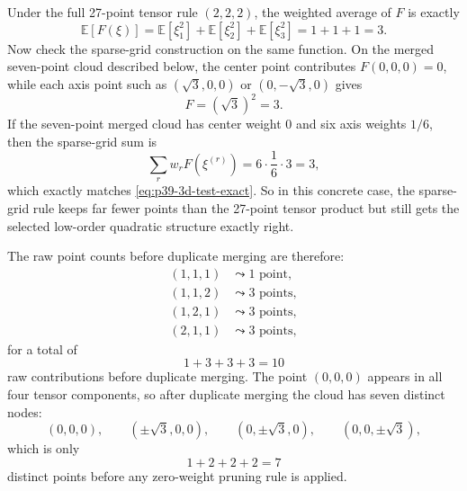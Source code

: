 \documentclass[11pt]{article}
\numberwithin{equation}{section}
\newcommand{\E}{\mathbb E}
\begin{document}
Under the full 27-point tensor rule \((2,2,2)\), the weighted average of
\(F\) is exactly
\begin{equation}
  \E[F(\xi)] = \E[\xi_1^2]+\E[\xi_2^2]+\E[\xi_3^2] = 1+1+1 = 3.
  \label{eq:p39-3d-test-exact}
\end{equation}
Now check the sparse-grid construction on the same function.  On the merged
seven-point cloud described below, the center point contributes
\(F(0,0,0)=0\), while each axis point such as \((\sqrt3,0,0)\) or
\((0,-\sqrt3,0)\) gives
\begin{equation}
  F = (\sqrt3)^2 = 3.
  \label{eq:p39-axis-value}
\end{equation}
If the seven-point merged cloud has center weight 0 and six axis weights
\(1/6\), then the sparse-grid sum is
\begin{equation}
  \sum_r w_rF(\xi^{(r)})
  = 6\cdot \frac16\cdot 3
  = 3,
  \label{eq:p39-3d-test-sparse-sum}
\end{equation}
which exactly matches \eqref{eq:p39-3d-test-exact}.  So in this concrete case,
the sparse-grid rule keeps far fewer points than the 27-point tensor product but
still gets the selected low-order quadratic structure exactly right.

The raw point counts before duplicate merging are therefore:
\begin{align}
  (1,1,1) &\leadsto 1 \text{ point},
  \label{eq:p37-3d-count-111}\\
  (1,1,2) &\leadsto 3 \text{ points},
  \label{eq:p37-3d-count-112}\\
  (1,2,1) &\leadsto 3 \text{ points},
  \label{eq:p37-3d-count-121}\\
  (2,1,1) &\leadsto 3 \text{ points},
  \label{eq:p37-3d-count-211}
\end{align}
for a total of
\begin{equation}
  1+3+3+3=10
  \label{eq:p37-3d-raw-count}
\end{equation}
raw contributions before duplicate merging.  The point \((0,0,0)\) appears in
all four tensor components, so after duplicate merging the cloud has seven
distinct nodes:
\begin{equation}
  (0,0,0),
  \qquad
  (\pm\sqrt3,0,0),
  \qquad
  (0,\pm\sqrt3,0),
  \qquad
  (0,0,\pm\sqrt3),
  \label{eq:p37-3d-final-nodes}
\end{equation}
which is only
\begin{equation}
  1+2+2+2 = 7
  \label{eq:p37-3d-final-count}
\end{equation}
distinct points before any zero-weight pruning rule is applied.
\end{document}
